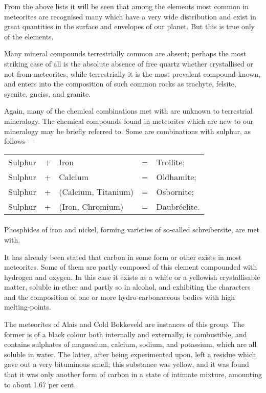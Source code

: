 \documentclass[a4paper, 12pt, oneside, polutonikogreek, english]{article}
\begin{document}
From the above lists it will be seen that among the elements most common in meteorites are recognised many which have a very wide distribution and exist in great quantities in the surface and envelopes of our planet. But this is true only of the elements.

Many mineral compounds terrestrially common are absent; perhaps the most striking case of all is the absolute absence of free quartz whether crystallised or not from meteorites, while terrestrially it is the most prevalent compound known, and enters into the composition of such common rocks as trachyte, felsite, syenite, gneiss, and granite.

Again, many of the chemical combinations met with are unknown to terrestrial mineralogy. The chemical compounds found in meteorites which are new to our mineralogy may be briefly referred to. Some are combinations with sulphur, as follows ---
\begin{table}[H]
    \centering
    \begin{tabular}{l l l l l}
        Sulphur & + & Iron & = & Troilite; \\
        Sulphur & + & Calcium & = & Oldhamite; \\
        Sulphur & + & (Calcium, Titanium) & = & Osbornite; \\
        Sulphur & + & (Iron, Chromium) & = & Daubréelite. \\
    \end{tabular}
\end{table}
\paragraph{}
Phosphides of iron and nickel, forming varieties of so-called schreibersite, are met with.

It has already been stated that carbon in some form or other exists in most meteorites. Some of them are partly composed of this element compounded with hydrogen and oxygen. In this case it exists as a white or a yellowish crystallisable matter, soluble in ether and partly so in alcohol, and exhibiting the characters and the composition of one or more hydro-carbonaceous bodies with high melting-points.

The meteorites of Alais and Cold Bokkeveld are instances of this group. The former is of a black colour both internally and externally, is combustible, and contains sulphates of magnesium, calcium, sodium, and potassium, which are all soluble in water. The latter, after being experimented upon, left a residue which gave out a very bituminous smell; this substance was yellow, and it was found that it was only another form of carbon in a state of intimate mixture, amounting to about 1.67 per cent.
\end{document}
